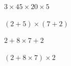 \begin{questions}
	
		\question[2]  $\num{3} \times 45 \times 20 \times \num{5} $
		\fillwithdottedlines{2cm}
		\begin{solution}
			
		\end{solution}
	
	
		\question[2]  $(2 + 5) \times (7 + 2) $
		\fillwithdottedlines{2cm}
		\begin{solution}
		
		\end{solution}
	
		\question[2]  $2 + 8 \times 7 + 2 $
		\fillwithdottedlines{2cm}
		\begin{solution}
			
		\end{solution}
	
		\question[2]  $(2 + 8 \times 7) \times 2 $
		\fillwithdottedlines{2cm}
		\begin{solution}
		
		\end{solution}
		
	\end{questions}
	
	
